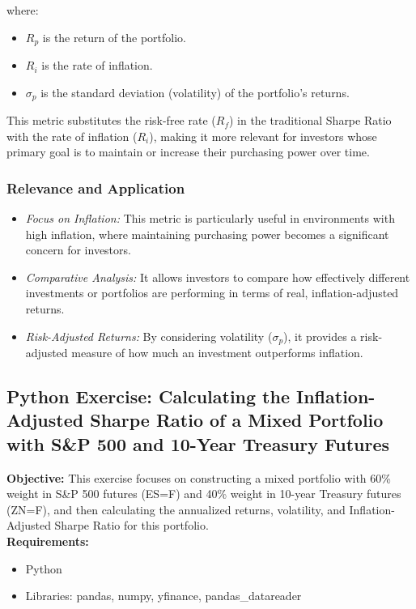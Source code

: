 \documentclass{article}
\begin{document}
where:
\begin{itemize}
    \item \( R_p \) is the return of the portfolio.
    \item \( R_i \) is the rate of inflation.
    \item \( \sigma_p \) is the standard deviation (volatility) of the portfolio’s returns.
\end{itemize}

This metric substitutes the risk-free rate (\( R_f \)) in the traditional Sharpe Ratio with the rate of inflation (\( R_i \)), making it more relevant for investors whose primary goal is to maintain or increase their purchasing power over time.

\subsubsection{Relevance and Application}

\begin{itemize}
    \item \textit{Focus on Inflation:} This metric is particularly useful in environments with high inflation, where maintaining purchasing power becomes a significant concern for investors.
    \item \textit{Comparative Analysis:} It allows investors to compare how effectively different investments or portfolios are performing in terms of real, inflation-adjusted returns.
    \item \textit{Risk-Adjusted Returns:} By considering volatility (\( \sigma_p \)), it provides a risk-adjusted measure of how much an investment outperforms inflation.
\end{itemize}


\subsection{Python Exercise: Calculating the Inflation-Adjusted Sharpe Ratio of a Mixed Portfolio with S\&P 500 and 10-Year Treasury Futures}

\textbf{Objective:} This exercise focuses on constructing a mixed portfolio with 60\% weight in S\&P 500 futures (ES=F) and 40\% weight in 10-year Treasury futures (ZN=F), and then calculating the annualized returns, volatility, and Inflation-Adjusted Sharpe Ratio for this portfolio. \\

\textbf{Requirements:}
\begin{itemize}
    \item Python
    \item Libraries: pandas, numpy, yfinance, pandas\_datareader
\end{itemize}
\end{document}

